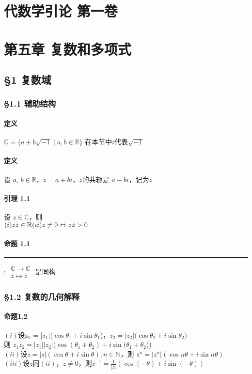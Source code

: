 \documentclass{ctexart}
\begin{document}
\fi

\section{代数学引论  第一卷}
\section{第五章  复数和多项式}
\subsection{§1  复数域}
\subsubsection{§1.1 辅助结构}
\paragraph{定义}
$\mathbb{C} =  \{ a + b\sqrt{-1} \mid a, b \in \mathbb{R} \}$
在本节中$i$代表$\sqrt{-1}$
\paragraph{定义}
设 $a$, $b \in \mathbb{R}$，$z = a + bi$，$z$的共轭是 $a - bi$，记为$\bar{z}$
\paragraph{引理 1.1}
设 $z \in \mathbb{C}$，则\\$(i) z\bar{z} \in \mathbb{R}\\ (ii) z \ne 0\Leftrightarrow z\bar{z} > 0$
\paragraph{命题 1.1}
\rule[8pt]{0.3cm}{0.05em} : 
$\begin{aligned} 
\mathbb{C} \rightarrow \mathbb{C} \\
z \mapsto \bar{z}
\end{aligned}$
 是同构
 \subsubsection{§1.2 复数的几何解释}
 \paragraph{命题1.2}
 $(i)$设z$_{1}$ = |$z_{1} |(\cos\theta_{1}+i\sin\theta_{1}$)，$z_{2} = | z_{2}|(\cos\theta_{2}+i\sin\theta_{2}$)\\
 则 $z_{1}z_{2} = |z_{1}||z_{2}|(\cos(\theta_{1}+\theta_{2})+i\sin(\theta_{1}+\theta_{2}$))\\
 $(ii)$设$z = |z|(\cos\theta+i\sin\theta),n \in \mathbb{N}$，则 $z^n = |z^n|(\cos n\theta+i\sin n\theta)$\\
 $(iii)$设$z$同$(ii)$，$z \ne 0$，则$z$$^{-1}$$ = \frac{1}{|z|}$$(\cos(-\theta)+i\sin(-\theta))$\\
\end{document}
